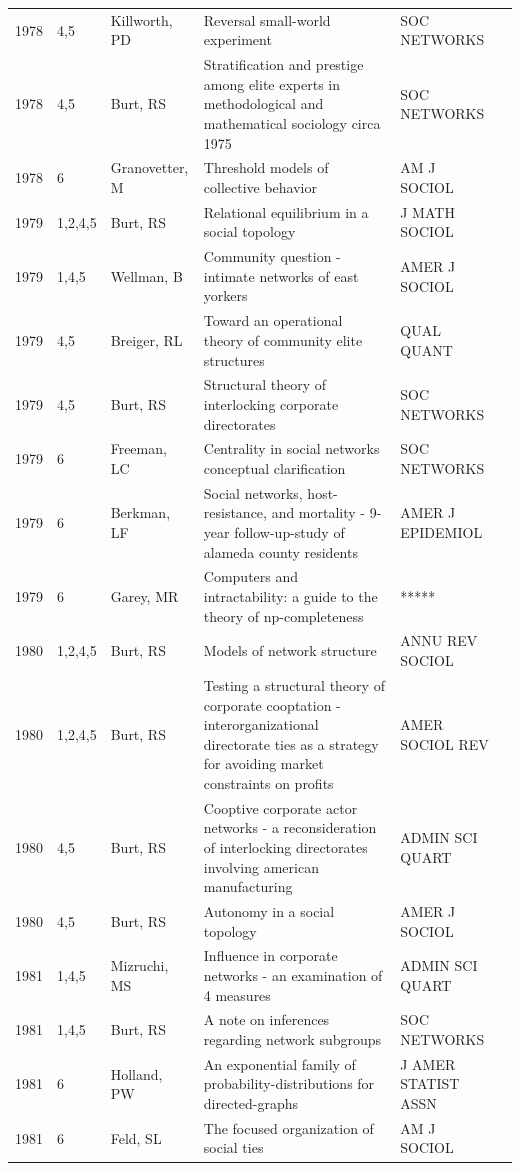 \documentclass[11pt]{article} %
\begin{document}
\begin{longtable}{p{0.8cm}|p{1.25cm}|p{2.8cm}|p{7.5cm}|p{3cm}l}
1978&	4,5&	Killworth, PD&	 Reversal small-world experiment&	SOC NETWORKS\\
1978&	4,5&	Burt, RS&	 Stratification and prestige among elite experts in methodological and mathematical sociology circa 1975&	SOC NETWORKS\\
1978&	6&	Granovetter, M&	 Threshold models of collective behavior&	AM J SOCIOL\\
1979&	1,2,4,5&	Burt, RS&	 Relational equilibrium in a social topology&	J MATH SOCIOL\\
1979&	1,4,5&	Wellman, B&	 Community question - intimate networks of east yorkers&	AMER J SOCIOL\\
1979&	4,5&	Breiger, RL&	 Toward an operational theory of community elite structures&	QUAL QUANT\\
1979&	4,5&	Burt, RS&	 Structural theory of interlocking corporate directorates&	SOC NETWORKS\\
1979&	6&	Freeman, LC&	 Centrality in social networks conceptual clarification&	SOC NETWORKS\\
1979&	6&	Berkman, LF&	 Social networks, host-resistance, and mortality - 9-year follow-up-study of alameda county residents&	AMER J EPIDEMIOL\\
1979&	6&	Garey, MR&	 Computers and intractability: a guide to the theory of np-completeness&	*****\\
1980&	1,2,4,5&	Burt, RS&	 Models of network structure&	ANNU REV SOCIOL\\
1980&	1,2,4,5&	Burt, RS&	 Testing a structural theory of corporate cooptation - interorganizational directorate ties as a strategy for avoiding market constraints on profits&         	AMER SOCIOL REV\\
1980&	4,5&	Burt, RS&	 Cooptive corporate actor networks - a reconsideration of interlocking directorates involving american manufacturing&         	ADMIN SCI QUART\\
1980&	4,5&	Burt, RS&	 Autonomy in a social topology&         	AMER J SOCIOL\\
1981&	1,4,5&	Mizruchi, MS&	 Influence in corporate networks - an examination of 4 measures&         	ADMIN SCI QUART\\
1981&	1,4,5&	Burt, RS&	 A note on inferences regarding network subgroups&         	SOC NETWORKS\\
1981&	6&	Holland, PW&	 An exponential family of probability-distributions for directed-graphs&         	J AMER STATIST ASSN\\
1981&	6&	Feld, SL&	 The focused organization of social ties&         	AM J SOCIOL\\

\end{longtable}
\end{document}
